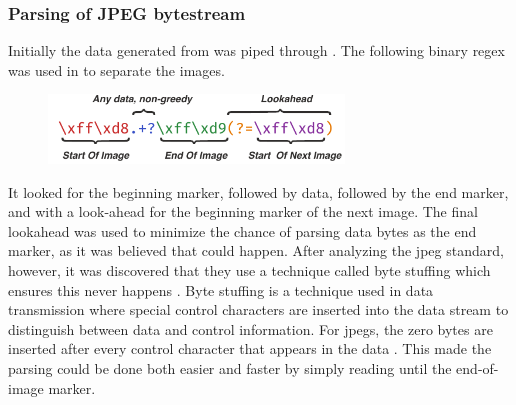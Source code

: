 \subsubsection{Parsing of JPEG bytestream}
Initially the data generated from \gs was piped through .
The following binary \gls{regex} was used in to separate the images.
\begin{figure}[H]
    \centering
    \includegraphics[width=0.7\textwidth]{figures/jpeg_regex.pdf}
\end{figure}
It looked for the beginning marker, followed by data, followed by the end marker, and with a look-ahead for the beginning marker of the next image.
The final lookahead was used to minimize the chance of parsing data bytes as the end marker, as it was believed that could happen.
After analyzing the \gls{jpeg} standard, however, it was discovered that they use a technique called byte stuffing which ensures this never happens \cite[91]{ccittINFORMATIONTECHNOLOGYDIGITAL1992}.
Byte stuffing is a technique used in data transmission where special control characters are inserted into the data stream to distinguish between data and control information.
For \glspl{jpeg}, the zero bytes are inserted after every control character that appears in the data \cite[91]{ccittINFORMATIONTECHNOLOGYDIGITAL1992}.
This made the parsing could be done both easier and faster by simply reading until the end-of-image marker.
